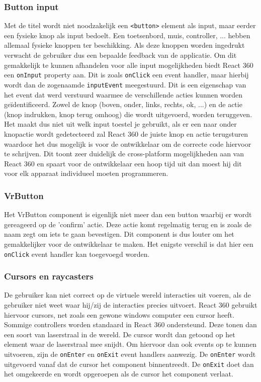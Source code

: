 \subsubsection{Button input}
Met de titel wordt niet noodzakelijk een \lstinline[basicstyle=\ttfamily\color{red}]|<button>| element als input, maar eerder een fysieke knop als input bedoelt. Een toetsenbord, muis, controller, ... hebben allemaal fysieke knoppen ter beschikking. Als deze knoppen worden ingedrukt verwacht de gebruiker dus een bepaalde feedback van de applicatie. Om dit gemakkelijk te kunnen afhandelen voor alle input mogelijkheden biedt React 360 een \lstinline[basicstyle=\ttfamily\color{red}]|onInput| property aan. Dit is zoals \lstinline[basicstyle=\ttfamily\color{red}]|onClick| een event handler, maar hierbij wordt dan de zogenaamde \lstinline[basicstyle=\ttfamily\color{red}]|inputEvent| meegestuurd. Dit is een eigenschap van het event dat werd verstuurd waarmee de verschillende acties kunnen worden geïdentificeerd. Zowel de knop (boven, onder, links, rechts, ok, ...) en de actie (knop indrukken, knop terug omhoog) die wordt uitgevoerd, worden teruggeven. Het maakt dus niet uit welk input toestel je gebruikt, als er een naar onder knopactie wordt gedetecteerd zal React 360 de juiste knop en actie terugsturen waardoor het dus mogelijk is voor de ontwikkelaar om de correcte code hiervoor te schrijven. Dit toont zeer duidelijk de cross-platform mogelijkheden aan van React 360 en spaart voor de ontwikkelaar een hoop tijd uit dan moest hij dit voor elk apparaat individueel moeten programmeren.

\subsubsection{VrButton}
Het VrButton component is eigenlijk niet meer dan een button waarbij er wordt gereageerd op de 'confirm' actie. Deze actie komt regelmatig terug en is zoals de naam zegt om iets te gaan bevestigen. Dit component is dus louter om het gemakkelijker voor de ontwikkelaar te maken. Het enigste verschil is dat hier een \lstinline[basicstyle=\ttfamily\color{red}]|onClick| event handler kan toegevoegd worden.

\subsubsection{Cursors en raycasters}
De gebruiker kan niet correct op de virtuele wereld interacties uit voeren, als de gebruiker niet weet waar hij/zij de interacties precies uitvoert. React 360 gebruikt hiervoor cursors, net zoals een gewone windows computer een cursor heeft. Sommige controllers worden standaard in React 360 ondersteund. Deze tonen dan een soort van laserstraal in de wereld. De cursor wordt dan getoond op het element waar de laserstraal mee snijdt. Om hiervoor dan ook events op te kunnen uitvoeren, zijn de \lstinline[basicstyle=\ttfamily\color{red}]|onEnter| en \lstinline[basicstyle=\ttfamily\color{red}]|onExit| event handlers aanwezig. De \lstinline[basicstyle=\ttfamily\color{red}]|onEnter| wordt uitgevoerd vanaf dat de cursor het component binnentreedt. De \lstinline[basicstyle=\ttfamily\color{red}]|onExit| doet dan het omgekeerde en wordt opgeroepen als de cursor het component verlaat.

